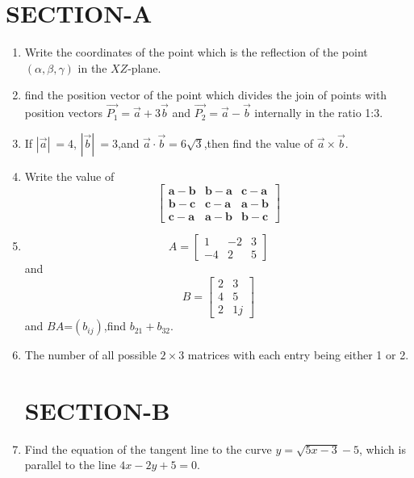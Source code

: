 \documentclass{article}
\newcommand{\myvec}[1]{\mathbf{#1}}
\begin{document}
\section*{\centering SECTION-A}
\begin{enumerate}
  \item Write the coordinates of the point which is the reflection of the point \((\alpha, \beta, \gamma)\) in the \(XZ\)-plane.
    
    \item  find the position vector of the point which divides the join of points with position vectors \( \vec{P_1} = \vec{a} + 3\vec{b} \) and \( \vec{P_2} = \vec{a} - \vec{b} \) internally in the ratio 1:3.
    
    \item If \( |\vec{a}|\ = 4 \), \( |\vec{b}|\ = 3 \),and \( \vec{a} \cdot \vec{b} = 6\sqrt{3} \),then find the value of \( \vec{a}\times \vec{b} \).
    
    \item Write the value of
    \[
    \begin{bmatrix}
    \myvec{a} - \myvec{b} & \myvec{b} - \myvec{a} & \myvec{c} - \myvec{a} \\
    \myvec{b} - \myvec{c} & \myvec{c} - \myvec{a} & \myvec{a} - \myvec{b} \\
    \myvec{c} - \myvec{a} & \myvec{a} - \myvec{b} & \myvec{b} - \myvec{c}
    \end{bmatrix}
    \]
    \item   


\[
A = \begin{bmatrix}
1 & -2 & 3 \\
-4 & 2 & 5
\end{bmatrix}
		\]
and
\[
B = \begin{bmatrix}
2 & 3 \\
4 & 5 \\
2 & 1
j\end{bmatrix}
\]
and  $BA$=$(b_{ij})$,find $b_{21}+b_{32}$.
     \item The number of all possible \(2 \times 3\) matrices with each entry being either 1 or 2.

\section*{\centering SECTION-B}    
  \item  Find the equation of the tangent line to the curve $ y = \sqrt{5x - 3} - 5 $, which is parallel to the line $ 4x - 2y + 5 = 0 $.


\end{enumerate}
\end{document}
